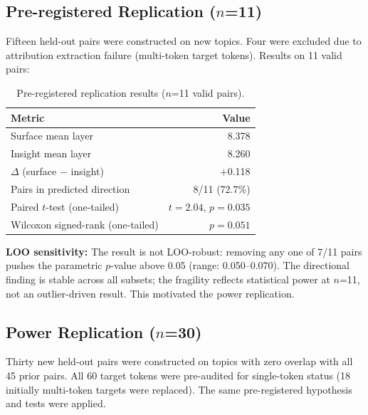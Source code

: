 \documentclass{article}
\begin{document}
\subsection{Pre-registered Replication ($n$=11)}

Fifteen held-out pairs were constructed on new topics. Four were excluded due to 
attribution extraction failure (multi-token target tokens). Results on 11 valid pairs:

\begin{table}[h]
\centering
\caption{Pre-registered replication results ($n$=11 valid pairs).}
\label{tab:rep1}
\begin{tabular}{lr}
\toprule
Metric & Value \\
\midrule
Surface mean layer & 8.378 \\
Insight mean layer & 8.260 \\
$\Delta$ (surface $-$ insight) & $+$0.118 \\
Pairs in predicted direction & 8/11 (72.7\%) \\
Paired $t$-test (one-tailed) & $t = 2.04$, $p = 0.035$ \\
Wilcoxon signed-rank (one-tailed) & $p = 0.051$ \\
\bottomrule
\end{tabular}
\end{table}

\textbf{LOO sensitivity:} The result is not LOO-robust: removing any one of 7/11 pairs 
pushes the parametric $p$-value above 0.05 (range: 0.050--0.070). The directional finding 
is stable across all subsets; the fragility reflects statistical power at $n$=11, not an 
outlier-driven result. This motivated the power replication.

\subsection{Power Replication ($n$=30)}

Thirty new held-out pairs were constructed on topics with zero overlap with all 45 prior pairs. 
All 60 target tokens were pre-audited for single-token status (18 initially multi-token targets 
were replaced). The same pre-registered hypothesis and tests were applied.
\end{document}

